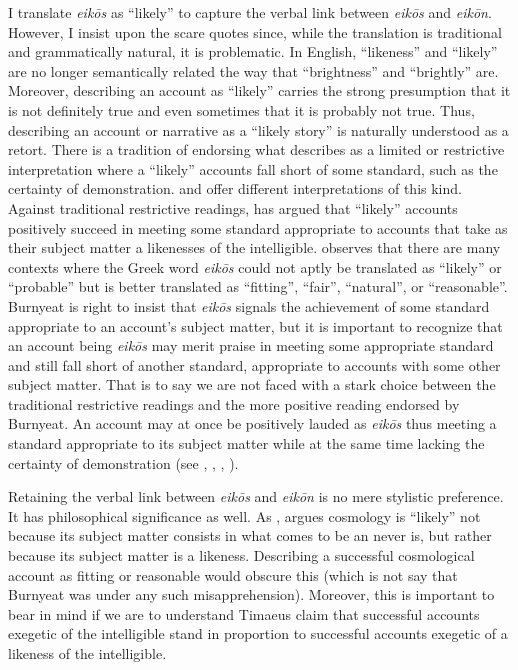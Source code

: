 I translate \emph{eikōs} as ``likely'' to capture the verbal link between \emph{eikōs} and \emph{eikōn}. However, I insist upon the scare quotes since, while the translation is traditional and grammatically natural, it is problematic. In English, ``likeness'' and ``likely'' are no longer semantically related the way that ``brightness'' and ``brightly'' are. Moreover, describing an account as ``likely'' carries the strong presumption that it is not definitely true and even sometimes that it is probably not true. Thus, describing an account or narrative as a ``likely story'' is naturally understood as a retort. There is a tradition of endorsing what \citet[214]{Betegh:2010aa} describes as a limited or restrictive interpretation where a ``likely'' accounts fall short of some standard, such as the certainty of demonstration. \citet[59--60, 73--4, 440--1]{Taylor:1928qb} and \citet[28--30]{Cornford:1935fk} offer different interpretations of this kind. Against traditional restrictive readings, \citet{Burnyeat:2005it} has argued that ``likely'' accounts positively succeed in meeting some standard appropriate to accounts that take as their subject matter a likenesses of the intelligible. \citet[146--7]{Burnyeat:2005it} observes that there are many contexts where the Greek word \emph{eikōs} could not aptly be translated as ``likely'' or ``probable'' but is better translated as ``fitting'', ``fair'', ``natural'', or ``reasonable''. Burnyeat is right to insist that \emph{eikōs} signals the achievement of some standard appropriate to an account's subject matter, but it is important to recognize that an account being \emph{eikōs} may merit praise in meeting some appropriate standard and still fall short of another standard, appropriate to accounts with some other subject matter. That is to say we are not faced with a stark choice between the traditional restrictive readings and the more positive reading endorsed by Burnyeat. An account may at once be positively lauded as \emph{eikōs} thus meeting a standard appropriate to its subject matter while at the same time lacking the certainty of demonstration (see \citealt{Betegh:2010aa}, \citealt{Mourelatos:2010bz}, \citealt[chapter 3]{Bryan:2012bt}, \citealt[33-4 n15]{Broadie:2012vl}).

Retaining the verbal link between \emph{eikōs} and \emph{eikōn} is no mere stylistic preference. It has philosophical significance as well. As \citealt[chapter 3]{Bryan:2012bt}, argues cosmology is ``likely'' not because its subject matter consists in what comes to be an never is, but rather because its subject matter is a likeness. Describing a successful cosmological account as fitting or reasonable would obscure this (which is not say that Burnyeat was under any such misapprehension). Moreover, this is important to bear in mind if we are to understand Timaeus claim that successful accounts exegetic of the intelligible stand in proportion to successful accounts exegetic of a likeness of the intelligible.

